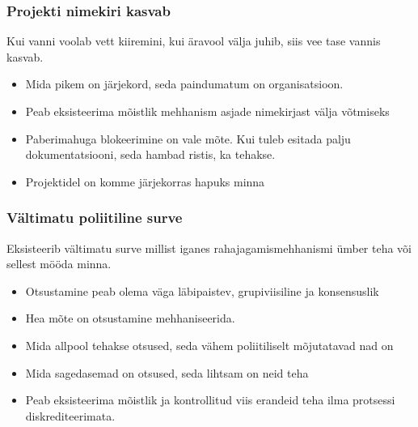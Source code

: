 \begin{frame}[fragile]
  \frametitle{Projekti nimekiri kasvab}
  Kui vanni voolab vett kiiremini, kui äravool välja juhib, siis vee tase vannis kasvab.
		\begin{itemize}
			\item Mida pikem on järjekord, seda paindumatum on organisatsioon. 
			\item Peab eksisteerima mõistlik mehhanism asjade nimekirjast välja võtmiseks
			\item Paberimahuga blokeerimine on vale mõte. Kui tuleb esitada palju dokumentatsiooni, seda hambad ristis, ka tehakse. 
			\item Projektidel on komme järjekorras hapuks minna
		\end{itemize}
\end{frame}

\begin{frame}[fragile]
  \frametitle{Vältimatu poliitiline surve}
  Eksisteerib vältimatu surve millist iganes rahajagamismehhanismi ümber teha või sellest mööda minna.
		\begin{itemize}
			\item Otsustamine peab olema väga läbipaistev, grupiviisiline ja konsensuslik
			\item Hea mõte on otsustamine mehhaniseerida. 
			\item Mida allpool tehakse otsused, seda vähem poliitiliselt mõjutatavad nad on
			\item Mida sagedasemad on otsused, seda lihtsam on neid teha 
			\item Peab eksisteerima mõistlik ja kontrollitud viis erandeid teha ilma protsessi diskrediteerimata. 
		\end{itemize}
\end{frame}

